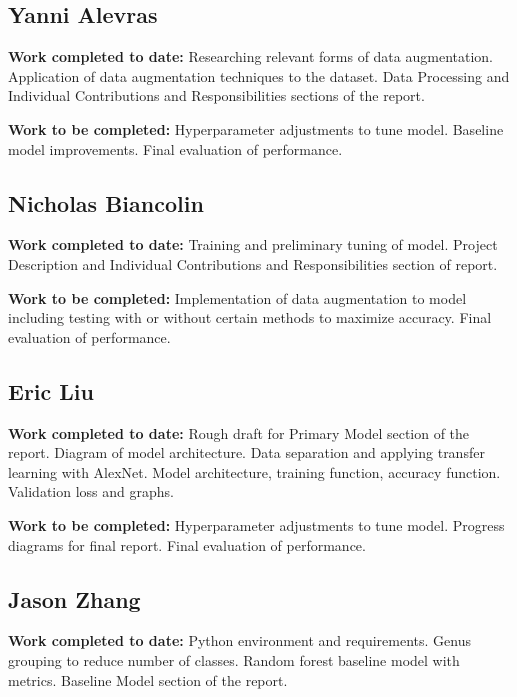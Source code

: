 \documentclass{article} %
\begin{document}
\subsection{Yanni Alevras}
\label{subsec:yanni_alevras}

\textbf{Work completed to date:}
Researching relevant forms of data augmentation. Application of data augmentation techniques to the dataset. Data Processing and Individual Contributions and Responsibilities sections of the report. 

\textbf{Work to be completed:}
Hyperparameter adjustments to tune model. Baseline model improvements. Final evaluation of performance.

\subsection{Nicholas Biancolin}
\label{subsec:nicholas_biancolin}

\textbf{Work completed to date:}
Training and preliminary tuning of model. Project Description and Individual Contributions and Responsibilities section of report.

\textbf{Work to be completed:}
Implementation of data augmentation to model including testing with or without certain methods to maximize accuracy. Final evaluation of performance.

\subsection{Eric Liu}
\label{subsec:eric_liu}

\textbf{Work completed to date:}
Rough draft for Primary Model section of the report. Diagram of model architecture. Data separation and applying transfer learning with AlexNet. Model architecture, training function, accuracy function. Validation loss and graphs.

\textbf{Work to be completed:}
Hyperparameter adjustments to tune model. Progress diagrams for final report. Final evaluation of performance.

\subsection{Jason Zhang}
\label{subsec:jason_zhang}

\textbf{Work completed to date:}
Python environment and requirements. Genus grouping to reduce number of classes. Random forest baseline model with metrics. Baseline Model section of the report.
\end{document}
